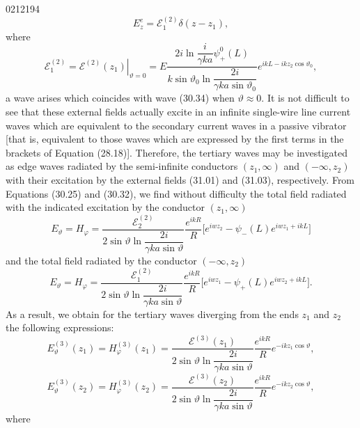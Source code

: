 \begin{scanpage}{0212}{194}
\[E_z^e=\mathcal E_1^{(2)}\delta(z-z_1),\tag{31.03}\]
where
\[\mathcal E_1^{(2)}=\left.\mathcal E^{(2)}(z_1)\right|_{\vartheta=0}
=E\frac{2i\ln\dfrac{i}{\gamma ka}\psi_+^0(L)}{k\sin\vartheta_0\ln\dfrac{2i}{\gamma ka\sin\vartheta_0}}e^{ikL-ikz_2\cos\vartheta_0},\tag{31.04}\]
a wave arises which coincides with wave (30.34) when $\vartheta\approx0$. It is not difficult to see that these external fields actually excite in an infinite single-wire line current waves which are equivalent to the secondary current waves in a passive vibrator [that is, equivalent to those waves which are expressed by the first terms in the brackets of Equation (28.18)]. Therefore, the tertiary waves may be investigated as edge waves radiated by the semi-infinite conductors $(z_1,\infty)$ and $(-\infty,z_2)$ with their excitation by the external fields (31.01) and (31.03), respectively. From Equations (30.25) and (30.32), we find without difficulty the total field radiated with the indicated excitation by the conductor $(z_1,\infty)$
\[E_\vartheta=H_\varphi=\frac{\mathcal E_2^{(2)}}{2\sin\vartheta\ln\dfrac{2i}{\gamma ka\sin\vartheta}}\frac{e^{ikR}}R\bigl[e^{iwz_2}-\psi_-(L)e^{iwz_1+ikL}\bigr]\tag{31.05}\]
and the total field radiated by the conductor $(-\infty,z_2)$
\[E_\vartheta=H_\varphi=\frac{\mathcal E_1^{(2)}}{2\sin\vartheta\ln\dfrac{2i}{\gamma ka\sin\vartheta}}\frac{e^{ikR}}R\bigl[e^{iwz_1}-\psi_+(L)e^{iwz_2+ikL}\bigr].\tag{31.06}\]
As a result, we obtain for the tertiary waves diverging from the ends $z_1$ and $z_2$ the following expressions:
\[E_\vartheta^{(3)}(z_1)=H_\varphi^{(3)}(z_1)=\frac{\mathcal E^{(3)}(z_1)}{2\sin\vartheta\ln\dfrac{2i}{\gamma ka\sin\vartheta}}\frac{e^{ikR}}R e^{-ikz_1\cos\vartheta},\tag{31.07}\]
\[E_\vartheta^{(3)}(z_2)=H_\varphi^{(3)}(z_2)=\frac{\mathcal E^{(3)}(z_2)}{2\sin\vartheta\ln\dfrac{2i}{\gamma ka\sin\vartheta}}\frac{e^{ikR}}R e^{-ikz_2\cos\vartheta},\tag{31.08}\]
where
\end{scanpage}
